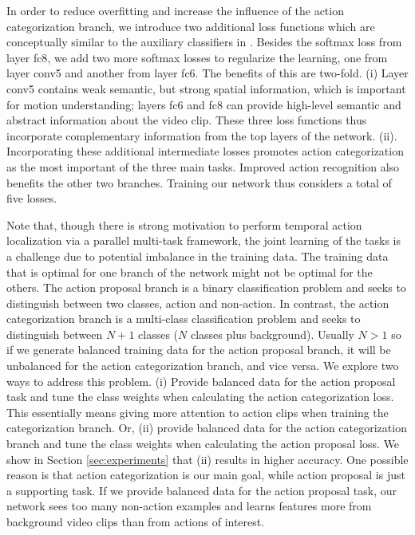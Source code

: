 \documentclass[10pt,twocolumn,letterpaper]{article}
\begin{document}
In order to reduce overfitting and increase the influence of the action categorization branch, we introduce two additional loss functions which are conceptually similar to the auxiliary classifiers in \cite{inception_v3_2015}. Besides the softmax loss from layer \textsf{fc8}, we add two more softmax losses to regularize the learning, one from layer \textsf{conv5} and another from layer \textsf{fc6}. The benefits of this are two-fold. 
(i) Layer \textsf{conv5} contains weak semantic, but strong spatial information, which is important for motion understanding; layers \textsf{fc6} and \textsf{fc8} can provide high-level semantic and abstract information about the video clip. These three loss functions thus incorporate complementary information from the top layers of the network. 
(ii). Incorporating these additional intermediate losses promotes action categorization as the most important of the three main tasks.
Improved action recognition also benefits the other two branches. 
Training our network thus considers a total of five losses.


Note that, though there is strong motivation to perform temporal action localization via a parallel multi-task framework, the joint learning of the tasks is a challenge due to potential imbalance in the training data. The training data that is optimal for one branch of the network might not be optimal for the others. The action proposal branch is a binary classification problem and seeks to distinguish between two classes, action and non-action. In contrast, the action categorization branch is a multi-class classification problem and seeks to distinguish between $N+1$ classes ($N$ classes plus background). Usually $N > 1$ so if we generate balanced training data for the action proposal branch, it will be unbalanced for the action categorization branch, and vice versa. 
We explore two ways to address this problem. (i) Provide balanced data for the action proposal task and tune the class weights when calculating the action categorization loss. This essentially means giving more attention to action clips when training the categorization branch. Or, (ii) provide balanced data for the action categorization branch and tune the class weights when calculating the action proposal loss.
We show in Section \ref{sec:experiments} that (ii) results in higher accuracy. One possible reason is that action categorization is our main goal, while action proposal is just a supporting task. If we provide balanced data for the action proposal task, our network sees too many non-action examples and learns features more from background video clips than from actions of interest.
\end{document}
